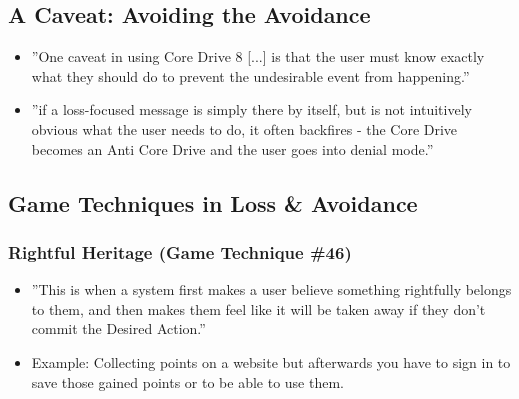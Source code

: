 \subsection{A Caveat: Avoiding the Avoidance}
\begin{itemize}
    \item ''One caveat in using Core Drive 8 [...] is that the user must know exactly what they should do to prevent the undesirable event from happening.''
    \item ''if a loss-focused message is simply there by itself, but is not intuitively obvious what the user needs to do, it often backfires - the Core Drive becomes an Anti Core Drive and the user goes into denial mode.''
\end{itemize}

\subsection{Game Techniques in Loss \& Avoidance}
    \subsubsection{Rightful Heritage (Game Technique \#46)}
        \begin{itemize}
            \item ''This is when a system first makes a user believe something rightfully belongs to them, and then makes them feel like it will be taken away if they don't commit the Desired Action.''
            \item Example: Collecting points on a website but afterwards you have to sign in to save those gained points or to be able to use them.
        \end{itemize}
        
